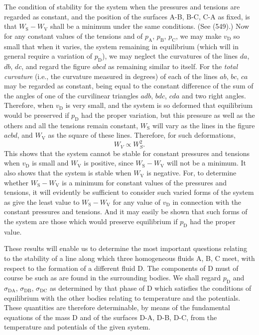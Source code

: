 \documentclass[12pt]{article}
\begin{document}
The condition of stability for the system when the pressures and tensions are regarded as constant, and the position of the surfaces A-B, B-C, C-A as fixed, is that $W_\text{S} - W_\text{V}$ shall be a minimum under the same conditions. (See (549).) Now for any constant values of the tensions and of $p_\text{A}$, $p_\text{B}$, $p_\text{C}$, we may make $v_\text{D}$ so small that when it varies, the system remaining in equilibrium (which will in general require a variation of $p_\text{D}$), we may neglect the curvatures of the lines $da$, $db$, $dc$, and regard the figure $abcd$ as remaining similar to itself. For the \textit{total curvature} (i.e., the curvature measured in degrees) of each of the lines $ab$, $bc$, $ca$ may be regarded as constant, being equal to the constant difference of the sum of the angles of one of the curvilinear triangles $adb$, $bdc$, $cda$ and two right angles. Therefore, when $v_\text{D}$ is very small, and the system is so deformed that equilibrium would be preserved if $p_\text{D}$ had the proper variation, but this pressure as well as the others and all the tensions remain constant, $W_\text{S}$ will vary as the lines in the figure $acbd$, and $W_\text{V}$ as the square of these lines. Therefore, for such deformations,
$$ W_V \propto W_S^2. $$
This shows that the system cannot be stable for constant pressures and tensions when $v_\text{D}$ is small and $W_\text{V}$ is positive, since $W_\text{S}-W_\text{V}$ will not be a minimum. It also shows that the system is stable when $W_\text{V}$ is negative. For, to determine whether $W_\text{S}-W_\text{V}$ is a minimum for constant values of the pressures and tensions, it will evidently be sufficient to consider such varied forms of the system as give the least value to $W_\text{S}-W_\text{V}$ for any value of $v_\text{D}$ in connection with the constant pressures and tensions. And it may easily be shown that such forms of the system are those which would preserve equilibrium if $p_\text{D}$ had the proper value.

These results will enable us to determine the most important questions relating to the stability of a line along which three homogeneous fluids A, B, C meet, with respect to the formation of a different fluid D. The components of D must of course be such as are found in the surrounding bodies. We shall regard $p_\text{D}$ and $\sigma_{\text{DA}}$, $\sigma_{\text{DB}}$, $\sigma_{\text{DC}}$ as determined by that phase of D which satisfies the conditions of equilibrium with the other bodies relating to temperature and the potentials. These quantities are therefore determinable, by means of the fundamental equations of the mass D and of the surfaces D-A, D-B, D-C, from the temperature and potentials of the given system.
\end{document}
